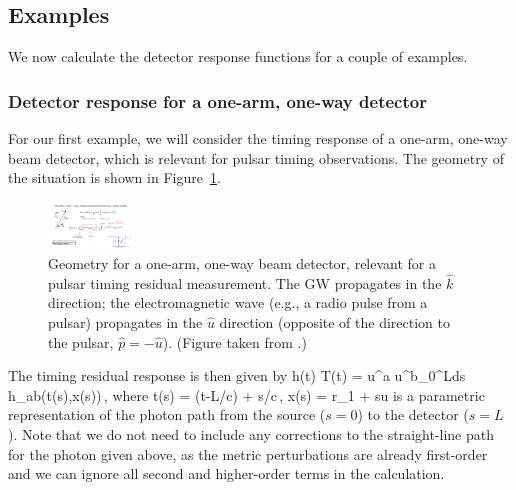 \subsection{Examples}

We now calculate the detector response functions for a couple of
examples.

\subsubsection{Detector response for a one-arm, one-way detector}

For our first example, we will consider the timing response of a one-arm,
one-way beam detector, which is relevant for pulsar timing observations.
The geometry of the situation is shown in Figure~\ref{f:one_arm_one_way}.
%
\begin{figure}[htbp!]
\begin{center}
\includegraphics[width=0.2\textwidth]{Figures/one_arm_one_way}
\caption{Geometry for a one-arm, one-way beam detector, relevant for 
a pulsar timing residual measurement.
The GW propagates in the $\hat k$ direction; the electromagnetic wave
(e.g., a radio pulse from a pulsar) propagates in the $\hat u$ direction
(opposite of the direction to the pulsar, $\hat p=-\hat u$).
(Figure taken from \cite{Romano-Cornish:2017}.)}
\label{f:one_arm_one_way}
\end{center}
\end{figure}
%
The timing residual response is then given by
\be
h(t)\equiv
\Delta T(t) =  u^a u^b\int_0^L{\rm d}s\> h_{ab}(t(s),\vec x(s))\,,
\ee
%
where
%
\be
t(s) = (t-L/c) + s/c\,, \qquad
\vec x(s) = \vec r_1 + s\hat u
\ee
%
is a parametric representation of the photon path from the 
source ($s=0$) to the detector ($s=L$).
Note that we do not need to include any corrections to
the straight-line path for the photon given above, as the 
metric perturbations are already first-order and we 
can ignore all second and higher-order terms in the calculation.

